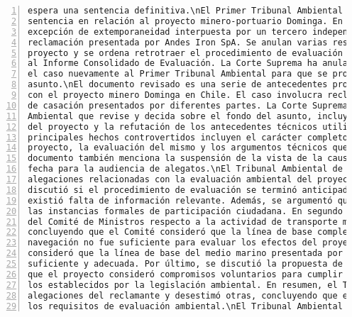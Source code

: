 \begin{Verbatim}[frame=lines, label=Elavoración propia -  Ejemplo de Contexto enviado por el Chatbot a OpenAI
				, fontsize=\footnotesize, numbers=left
				, baselinestretch=0.4
				, formatcom=\color{gray}]
espera una sentencia definitiva.\nEl Primer Tribunal Ambiental de Chile ha emitido una
sentencia en relación al proyecto minero-portuario Dominga. En la sentencia, se rechaza la
excepción de extemporaneidad interpuesta por un tercero independiente y se acoge la
reclamación presentada por Andes Iron SpA. Se anulan varias resoluciones relacionadas con el
proyecto y se ordena retrotraer el procedimiento de evaluación ambiental a una etapa posterior
al Informe Consolidado de Evaluación. La Corte Suprema ha anulado la sentencia y ha remitido
el caso nuevamente al Primer Tribunal Ambiental para que se pronuncie sobre el fondo del
asunto.\nEl documento revisado es una serie de antecedentes procesales de un caso relacionado
con el proyecto minero Dominga en Chile. El caso involucra reclamaciones judiciales y recursos
de casación presentados por diferentes partes. La Corte Suprema ha ordenado al Tribunal
Ambiental que revise y decida sobre el fondo del asunto, incluyendo la evaluación ambiental
del proyecto y la refutación de los antecedentes técnicos utilizados para rechazarlo. Los
principales hechos controvertidos incluyen el carácter completo de los antecedentes del
proyecto, la evaluación del mismo y los argumentos técnicos que fundamentaron su rechazo. El
documento también menciona la suspensión de la vista de la causa y la fijación de una nueva
fecha para la audiencia de alegatos.\nEl Tribunal Ambiental de Chile revisó una serie de
alegaciones relacionadas con la evaluación ambiental del proyecto Dominga. En primer lugar, se
discutió si el procedimiento de evaluación se terminó anticipadamente, concluyendo que no
existió falta de información relevante. Además, se argumentó que el proyecto cumplió con todas
las instancias formales de participación ciudadana. En segundo lugar, se analizó el criterio
del Comité de Ministros respecto a la actividad de transporte marítimo del proyecto,
concluyendo que el Comité consideró que la línea de base complementaria para las rutas de
navegación no fue suficiente para evaluar los efectos del proyecto. Sin embargo, el Tribunal
consideró que la línea de base del medio marino presentada por el titular del proyecto fue
suficiente y adecuada. Por último, se discutió la propuesta de la Casa del Mar, concluyendo
que el proyecto consideró compromisos voluntarios para cumplir con estándares más altos que
los establecidos por la legislación ambiental. En resumen, el Tribunal acogió algunas
alegaciones del reclamante y desestimó otras, concluyendo que el proyecto Dominga cumplió con
los requisitos de evaluación ambiental.\nEl Tribunal Ambiental ha revisado los argumentos

\end{Verbatim}
